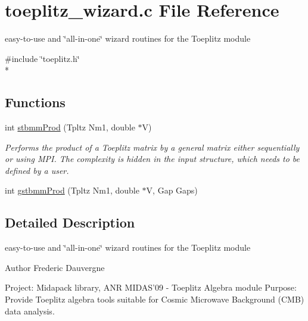 \section{toeplitz\-\_\-wizard.\-c File Reference}
\label{toeplitz__wizard_8c}


easy-\/to-\/use and \char`\"{}all-\/in-\/one\char`\"{} wizard routines for the Toeplitz module  


{\ttfamily \#include \char`\"{}toeplitz.\-h\char`\"{}}\\*
\subsection*{Functions}
\begin{DoxyCompactItemize}
\item 
int \hyperlink{toeplitz__wizard_8c_aeebf9c59eb08efb1f4ce0cf93c8a4565}{stbmm\-Prod} (Tpltz Nm1, double $\ast$V)
\begin{DoxyCompactList}\small\item\em Performs the product of a Toeplitz matrix by a general matrix either sequentially or using M\-P\-I. The complexity is hidden in the input structure, which needs to be defined by a user. \end{DoxyCompactList}\item 
int \hyperlink{toeplitz__wizard_8c_a473d1ee11c83c7d9f6db6e057dc86125}{gstbmm\-Prod} (Tpltz Nm1, double $\ast$V, Gap Gaps)
\end{DoxyCompactItemize}


\subsection{Detailed Description}
easy-\/to-\/use and \char`\"{}all-\/in-\/one\char`\"{} wizard routines for the Toeplitz module \begin{DoxyAuthor}{Author}
Frederic Dauvergne
\end{DoxyAuthor}
Project\-: Midapack library, A\-N\-R M\-I\-D\-A\-S'09 -\/ Toeplitz Algebra module Purpose\-: Provide Toeplitz algebra tools suitable for Cosmic Microwave Background (C\-M\-B) data analysis.

